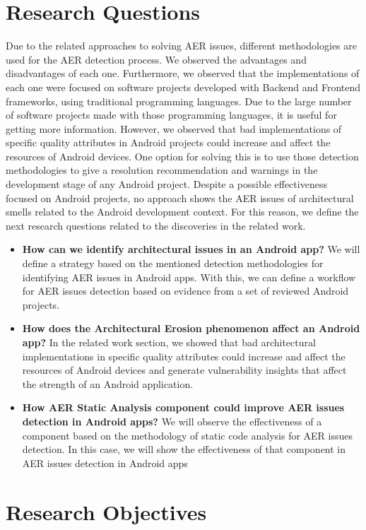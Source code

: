 \section{Research Questions}
Due to the related approaches to solving AER issues, different methodologies are used for the AER detection process. We observed the advantages and disadvantages of each one. Furthermore, we observed that the implementations of each one were focused on software projects developed with Backend and Frontend frameworks, using traditional programming languages. Due to the large number of software projects made with those programming languages, it is useful for getting more information. However, we observed that bad implementations of specific quality attributes in Android projects could increase and affect the resources of Android devices. One option for solving this is to use those detection methodologies to give a resolution recommendation and warnings in the development stage of any Android project. Despite a possible effectiveness focused on Android projects, no approach shows the AER issues of architectural smells related to the Android development context. For this reason, we define the next research questions related to the discoveries in the related work.

\begin{itemize}
	\item \textbf{How can we identify architectural issues in an Android app?} We will define a strategy based on the mentioned detection methodologies for identifying AER issues in Android apps. With this, we can define a workflow for AER issues detection based on evidence from a set of reviewed Android projects.
	\item \textbf{How does the Architectural Erosion phenomenon affect an Android app?} In the related work section, we showed that bad architectural implementations in specific quality attributes could increase and affect the resources of Android devices and generate vulnerability insights that affect the strength of an Android application.
	\item \textbf{How AER Static Analysis component could improve AER issues detection in Android apps?} We will observe the effectiveness of a component based on the methodology of static code analysis for AER issues detection. In this case, we will show the effectiveness of that component in AER issues detection in Android apps
\end{itemize}



\section{Research Objectives}







